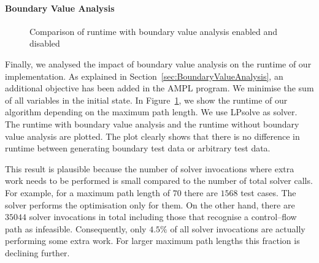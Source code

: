 \documentclass[runningheads,a4paper]{llncs}%
\begin{document}
\paragraph{Boundary Value Analysis}
\label{sec:caseStudyBoundaryValues}
\begin{figure}
\begin{center}
%
\end{center}%
\caption{Comparison of runtime with boundary value analysis enabled and disabled}%
\label{fig:RuntimeBoundaryValue}%
\end{figure}%
Finally, we analysed the impact of boundary value analysis on the runtime of our
implementation. As explained in Section~\ref{sec:BoundaryValueAnalysis}, an
additional objective has been added in the AMPL program. We minimise the sum of
all variables in the initial state. In Figure~\ref{fig:RuntimeBoundaryValue}, we
show the runtime of our algorithm depending on the maximum path length. We use
LPsolve as solver. The runtime with boundary value analysis and the runtime
without boundary value analysis are plotted. The plot clearly shows that there
is no difference in runtime between generating boundary test data or arbitrary
test data.

This result is plausible because the number of solver invocations where extra
work needs to be performed is small compared to the number of total solver
calls. For example, for a maximum path length of $70$ there are $1568$ test
cases. The solver performs the optimisation only for them. On the other hand,
there are $35044$ solver invocations in total including those that recognise a
control--flow path as infeasible. Consequently, only $4.5\%$ of all solver
invocations are actually performing some extra work. For larger maximum path
lengths this fraction is declining further.
%
\end{document}
